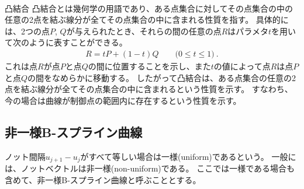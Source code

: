 ~\vfill
\begin{\Columnname}{凸結合}
凸結合とは幾何学の用語であり、ある点集合に対してその点集合の中の任意の2点を結ぶ線分が全てその点集合の中に含まれる性質を指す。
具体的には、2つの点$P$, $Q$が与えられたとき、それらの間の任意の点$R$はパラメタ$t$を用いて次のように表すことができる。
\begin{align*}
  R = tP+(1-t)Q\qquad\big(0 \leq t \leq 1\big)\ .
\end{align*}
これは点$R$が点$P$と点$Q$の間に位置することを示し、また$t$の値によって点$R$は点$P$と点$Q$の間をなめらかに移動する。
したがって凸結合は、ある点集合の任意の2点を結ぶ線分が全てその点集合の中に含まれるという性質を示す。
すなわち、今の場合は曲線が制御点の範囲内に存在するという性質を示す。
\end{\Columnname}


\clearpage
\subsection{非一様B-スプライン曲線}
ノット間隔$u_{j+1}-u_j$がすべて等しい場合は一様(uniform)であるという。
一般には、ノットベクトルは非一様(non-uniform)である。
ここでは一様である場合も含めて、非一様B-スプライン曲線と呼ぶこととする。



